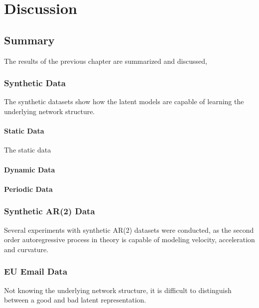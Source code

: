 \chapter{Discussion}\label{ch:Discussion}

\section{Summary}

    The results of the previous chapter are summarized and discussed,

    \subsection{Synthetic Data}
    
        The synthetic datasets show how the latent models are capable of learning the underlying network structure. 
        
        \subsubsection{Static Data}
        
            The static data 
        
        \subsubsection{Dynamic Data}
        
        \subsubsection{Periodic Data}
        
    \subsection{Synthetic AR(2) Data}
    
        Several experiments with synthetic AR(2) datasets were conducted, as the second order autoregressive process in theory is capable of modeling velocity, acceleration and curvature.
    
    \subsection{EU Email Data}
    
        Not knowing the underlying network structure, it is difficult to distinguish between a good and bad latent representation.
    
